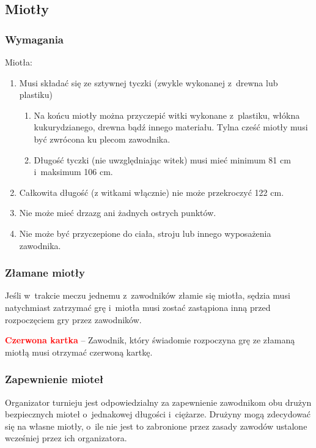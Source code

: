 \documentclass[12pt,a4paper]{article}
\newcommand\redcard[1]{\bgroup\textcolor{red}{\textbf{#1}}}
\begin{document}
\subsection{Miotły}

\subsubsection{Wymagania}
Miotła:

\begin{enumerate}
	\item
	      Musi składać się ze sztywnej tyczki (zwykle wykonanej z~drewna lub
	      plastiku)

	      \begin{enumerate}
		      \item
		            Na końcu miotły można przyczepić witki wykonane z~plastiku, włókna
		            kukurydzianego, drewna bądź innego materiału. Tylna cześć miotły
		            musi być zwrócona ku plecom zawodnika.
		      \item
				Długość tyczki (nie uwzględniając witek) musi mieć minimum 81 cm i~maksimum 106 cm.
	      \end{enumerate}
	\item
	      Całkowita długość (z witkami włącznie) nie może przekroczyć 122 cm.
	\item
	      Nie może mieć drzazg ani żadnych ostrych punktów.
	\item
	      Nie może być przyczepione do ciała, stroju lub innego wyposażenia
	      zawodnika.
\end{enumerate}

\subsubsection{Złamane miotły}
Jeśli w~trakcie meczu jednemu z~zawodników złamie się miotła, sędzia musi natychmiast zatrzymać grę i~miotła musi zostać zastąpiona inną przed rozpoczęciem gry przez
zawodników.

\redcard{Czerwona kartka} -- Zawodnik, który świadomie rozpoczyna grę ze
złamaną miotłą musi otrzymać czerwoną kartkę.

\subsubsection{Zapewnienie mioteł}
Organizator turnieju jest odpowiedzialny za zapewnienie zawodnikom obu
drużyn bezpiecznych mioteł o~jednakowej długości i~ciężarze. Drużyny
mogą zdecydować się na własne miotły, o~ile nie jest to zabronione 
przez zasady zawodów ustalone wcześniej przez ich organizatora.
\end{document}

